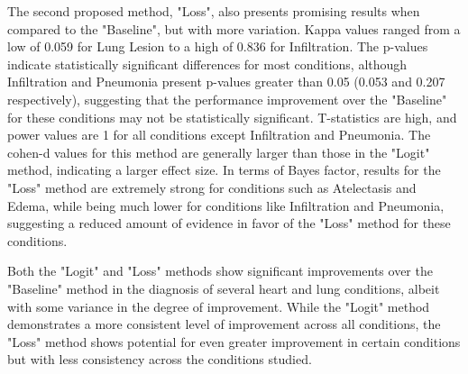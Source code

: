 The second proposed method, "Loss", also presents promising results when compared to the "Baseline", but with more variation. Kappa values ranged from a low of 0.059 for Lung Lesion to a high of 0.836 for Infiltration. The p-values indicate statistically significant differences for most conditions, although Infiltration and Pneumonia present p-values greater than 0.05 (0.053 and 0.207 respectively), suggesting that the performance improvement over the "Baseline" for these conditions may not be statistically significant. T-statistics are high, and power values are 1 for all conditions except Infiltration and Pneumonia. The cohen-d values for this method are generally larger than those in the "Logit" method, indicating a larger effect size. In terms of Bayes factor, results for the "Loss" method are extremely strong for conditions such as Atelectasis and Edema, while being much lower for conditions like Infiltration and Pneumonia, suggesting a reduced amount of evidence in favor of the "Loss" method for these conditions. 

Both the "Logit" and "Loss" methods show significant improvements over the "Baseline" method in the diagnosis of several heart and lung conditions, albeit with some variance in the degree of improvement. While the "Logit" method demonstrates a more consistent level of improvement across all conditions, the "Loss" method shows potential for even greater improvement in certain conditions but with less consistency across the conditions studied.

